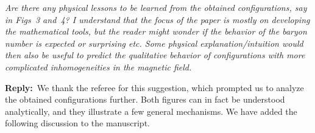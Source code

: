\documentclass[11pt,a4paper]{article}
\newenvironment{referee}{\par\medskip\noindent\color{black!70}\itshape}{\par\medskip}
\newcommand{\reply}{\noindent\textbf{Reply:}\ }
\begin{document}
\begin{referee}
Are there any physical lessons to be learned from the obtained configurations, say in Figs~3 and~4? I understand that the focus of the paper is mostly on developing the mathematical tools, but the reader might wonder if the behavior of the baryon number is expected or surprising etc. Some physical explanation/intuition would then also be useful to predict the qualitative behavior of configurations with more complicated inhomogeneities in the magnetic field.
\end{referee}

\reply We thank the referee for this suggestion, which prompted us to analyze the obtained configurations further. Both figures can in fact be understood analytically, and they illustrate a few general mechanisms. We have added the following discussion to the manuscript.
\end{document}
